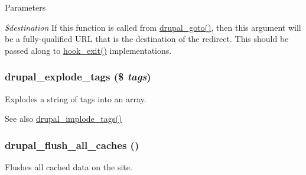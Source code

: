 \begin{DoxyParams}{Parameters}
\item[{\em \$destination}]If this function is called from \hyperlink{group__http__handling_ga5b68d7a934713d1d623b2b32a732235d}{drupal\_\-goto()}, then this argument will be a fully-\/qualified URL that is the destination of the redirect. This should be passed along to \hyperlink{group__hooks_gaab945bbc2e651510aee460dcc8691366}{hook\_\-exit()} implementations. \end{DoxyParams}
\hypertarget{common_8inc_ae5bd302bab285bc819a70737f6121953}{
\subsubsection[{drupal\_\-explode\_\-tags}]{\setlength{\rightskip}{0pt plus 5cm}drupal\_\-explode\_\-tags (\$ {\em tags})}}
\label{common_8inc_ae5bd302bab285bc819a70737f6121953}
Explodes a string of tags into an array.

\begin{DoxySeeAlso}{See also}
\hyperlink{common_8inc_a29df41fde25e9fcace627a628806c978}{drupal\_\-implode\_\-tags()} 
\end{DoxySeeAlso}
\hypertarget{common_8inc_ac119432cefbdbb25647944d4ca3f82f8}{
\subsubsection[{drupal\_\-flush\_\-all\_\-caches}]{\setlength{\rightskip}{0pt plus 5cm}drupal\_\-flush\_\-all\_\-caches ()}}
\label{common_8inc_ac119432cefbdbb25647944d4ca3f82f8}
Flushes all cached data on the site.

